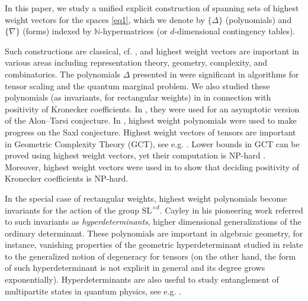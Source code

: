 \documentclass[12pt, reqno]{amsart}
\theoremstyle{definition}
\newtheorem{remark}{Remark}[section]
\let\oldbigwedge\bigwedge
\renewcommand{\bigwedge}{
  \mathop{
    \vcenter{
      \hbox{\scalebox{0.9}{$\displaystyle\oldbigwedge$}}
    }
  }
}
\begin{document}
\vspace{0.5em}

In this paper, we study a unified explicit construction of spanning sets of highest weight vectors for the spaces \eqref{eq1}, which we denote by $\{\Delta\}$ (polynomials) and $\{\nabla\}$ (forms) indexed by $\mathbb{N}$-hypermatrices (or $d$-dimensional contingency tables). 

\vspace{0.5em}

Such constructions are classical, cf. \cite{processi, bi13, widg, widg1}, 
and highest weight vectors are important in various areas including representation theory, geometry, complexity, and combinatorics. 
The polynomials $\Delta$ presented in \cite{widg, widg1} were significant in algorithms for tensor scaling and the quantum marginal problem. %
We also studied these polynomials (as invariants, for rectangular weights) in \cite{ayfund} in connection with positivity of Kronecker coefficients. 
In \cite{yel}, they were used for an asymptotic version of the Alon--Tarsi conjecture. 
In \cite{iken15}, highest weight polynomials were used to make progress on the Saxl conjecture.
Highest weight vectors of tensors are important in Geometric Complexity Theory (GCT), see e.g. \cite{bi13, bi, bdi}. 
Lower bounds in GCT can be proved using highest weight vectors, yet their computation is NP-hard \cite{bdi}. %
Moreover, highest weight vectors were used %
in \cite{imw17} to show that deciding positivity of Kronecker coefficients is NP-hard. 


In the special case of rectangular weights, highest weight polynomials become invariants for the action of the group $\mathrm{SL}^{\times d}$. Cayley in his pioneering work \cite{cay2} referred to such invariants as {\it hyperdeterminants}, higher dimensional generalizations of the ordinary determinant. These polynomials are important in algebraic geometry, for instance, vanishing properties of the {geometric hyperdeterminant} studied in \cite{gkz} relate to the generalized notion of degeneracy for tensors (on the other hand, the form of such hyperdeterminant is not explicit in general and its degree grows exponentially). Hyperdeterminants are also useful to study entanglement of multipartite states in quantum physics, see e.g. \cite{miyake}. %
\end{document}
